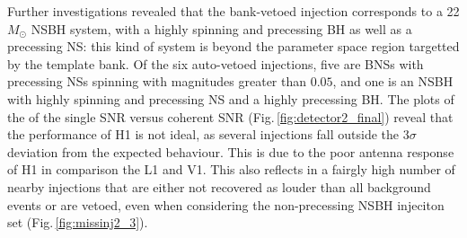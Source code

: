 \documentclass[binding=0.6cm, LaM]{sapthesis}
\begin{document}
        Further investigations revealed that the bank-vetoed injection corresponds to a 22$M_\odot$ NSBH system,
        with a highly spinning and precessing BH as well as a precessing NS: this kind of system is beyond the parameter space region targetted by the template bank.
        Of the six auto-vetoed injections, five are BNSs with precessing NSs spinning with magnitudes greater than $0.05$, and
        one is an NSBH with highly spinning and precessing NS and a highly precessing BH.
        The plots of the of the single SNR versus coherent SNR (Fig.\,\ref{fig:detector2_final}) reveal that the performance of H1 is not ideal, as several injections fall outside the $3\sigma$ deviation from the expected behaviour.
        This is due to the poor antenna response of H1 in comparison the L1 and V1.  This also reflects in a fairgly high number of nearby injections that are either not recovered as louder than all background events or are vetoed, even when considering the non-precessing NSBH injeciton set (Fig.\,\ref{fig:missinj2_3}).
\end{document}
